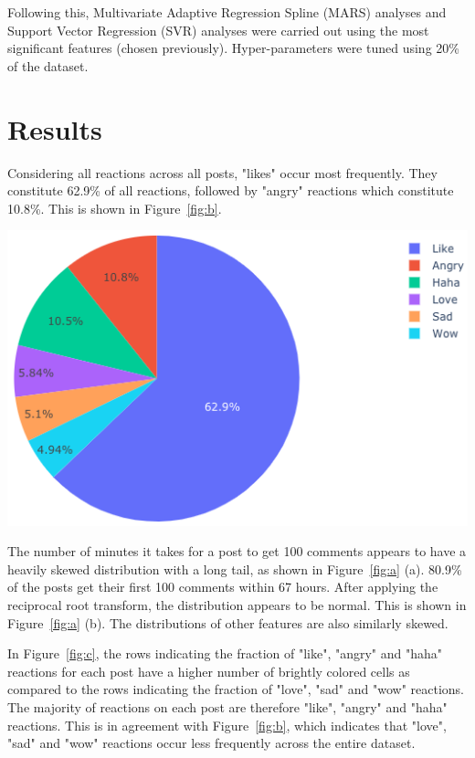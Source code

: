 \documentclass[twoside]{article}
\begin{document}
\begin{multicols}{2}
Following this, Multivariate Adaptive Regression Spline (MARS) analyses and Support Vector Regression (SVR) analyses were carried out using the most significant features (chosen previously). Hyper-parameters were tuned using 20\% of the dataset.
\section{Results}
Considering all reactions across all posts, "likes" occur most frequently. They constitute 62.9\% of all reactions, followed by "angry" reactions which constitute 10.8\%. This is shown in Figure~\ref{fig:b}. 

\begingroup
\centering
\includegraphics[width=7 cm]{reaction_percentage}
\label{fig:b}
\endgroup

The number of minutes it takes for a post to get 100 comments appears to have a heavily skewed distribution with a long tail, as shown in Figure~\ref{fig:a} (a). 80.9\% of the posts get their first 100 comments within 67 hours. After applying the reciprocal root transform, the distribution appears to be normal. This is shown in Figure~\ref{fig:a} (b). The distributions of other features are also similarly skewed. 

In Figure~\ref{fig:c}, the rows indicating the fraction of "like", "angry" and "haha" reactions for each post have a higher number of brightly colored cells as compared to the rows indicating the fraction of "love", "sad" and "wow" reactions. The majority of reactions on each post are therefore "like", "angry" and "haha" reactions. This is in agreement with Figure~\ref{fig:b}, which indicates that "love", "sad" and "wow" reactions occur less frequently across the entire dataset. 
\end{multicols}
\end{document}

